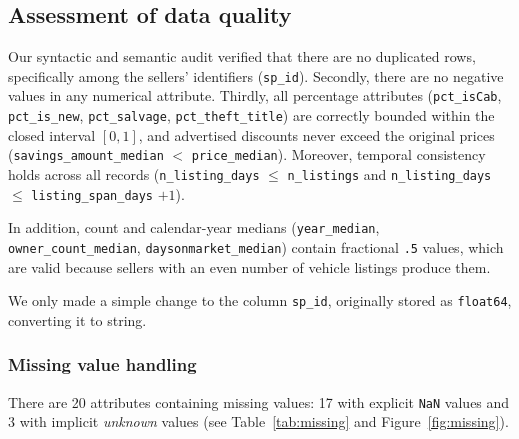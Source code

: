 \documentclass[11pt,a4paper]{article}
\numberwithin{table}{section}
\numberwithin{figure}{section}
\begin{document}
\subsection{Assessment of data quality}
\label{sec:quality}
Our syntactic and semantic audit verified that there are no duplicated rows, specifically among the sellers' identifiers (\texttt{sp\_id}). Secondly, there are no negative values in any numerical attribute. Thirdly, all percentage attributes (\texttt{pct\_isCab}, \texttt{pct\_is\_new}, \texttt{pct\_salvage}, \texttt{pct\_theft\_title}) are correctly bounded within the closed interval $[0,1]$, and advertised discounts never exceed the original prices (\texttt{savings\_amount\_median} $<$ \texttt{price\_median}). Moreover, temporal consistency holds across all records (\texttt{n\_listing\_days} $\leq$ \texttt{n\_listings} and \texttt{n\_listing\_days} $\leq$ \texttt{listing\_span\_days} $+1$).

\begin{sloppypar}
In addition, count and calendar-year medians (\texttt{year\_median}, \texttt{owner\_count\_median}, \texttt{daysonmarket\_median}) contain fractional \texttt{.5} values, which are valid because sellers with an even number of vehicle listings produce them.
\end{sloppypar}

We only made a simple change to the column \texttt{sp\_id}, originally stored as \texttt{float64}, converting it to string.

\subsubsection{Missing value handling}
\label{sec:missing}
There are 20 attributes containing missing values: 17 with explicit \texttt{NaN} values and 3 with implicit \textit{unknown} values (see Table~\ref{tab:missing} and Figure~\ref{fig:missing}).
\end{document}
